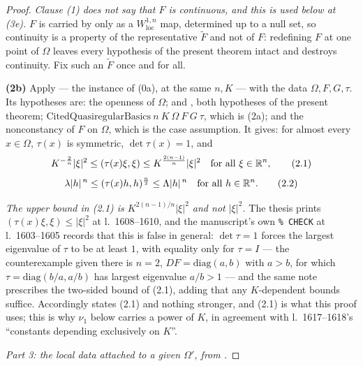 \begin{proof}
\emph{Clause (1) does not say that $F$ is continuous, and this is used below at
(3e).}  $F$ is carried by  only as a
$W^{1,n}_{\mathrm{loc}}$ map, determined up to a null set, so continuity is a
property of the representative $\widetilde F$ and not of $F$: redefining $F$ at
one point of $\Omega$ leaves every hypothesis of the present theorem intact and
destroys continuity.  Fix such an $\widetilde F$ once and for all.

\textbf{(2b)} Apply  --- the instance of (0a),
at the same $n,K$ --- with the data $\Omega,F,G,\tau$.  Its hypotheses are: the
openness of $\Omega$;  and
, both hypotheses of the present theorem;
$\mathrm{CitedQuasiregularBasics}\ n\ K\ \Omega\ F\ G\ \tau$, which is (2a); and
the nonconstancy of $F$ on $\Omega$, which is the case assumption.  It gives:
for almost every $x\in\Omega$, $\tau(x)$ is symmetric, $\det\tau(x)=1$, and
\[
K^{-\frac2n}|\xi|^2\le(\tau(x)\xi,\xi)\le K^{\frac{2(n-1)}n}|\xi|^2
\quad\text{for all }\xi\in\mathbb{R}^n,
\tag{2.1}
\]
\[
\lambda|h|^{\,n}\le(\tau(x)h,h)^{\frac n2}\le\Lambda|h|^{\,n}
\quad\text{for all }h\in\mathbb{R}^n .
\tag{2.2}
\]

\emph{The upper bound in \textup{(2.1)} is $K^{2(n-1)/n}|\xi|^2$ and not
$|\xi|^2$.}  The thesis prints $(\tau(x)\xi,\xi)\le|\xi|^2$ at l.~1608--1610, and
the manuscript's own \verb|% CHECK| at l.~1603--1605 records that this is false
in general: $\det\tau=1$ forces the largest eigenvalue of $\tau$ to be at least
$1$, with equality only for $\tau=I$ --- the counterexample given there is $n=2$,
$DF=\mathrm{diag}(a,b)$ with $a>b$, for which $\tau=\mathrm{diag}(b/a,a/b)$ has
largest eigenvalue $a/b>1$ --- and the same note prescribes the two-sided bound
of (2.1), adding that any $K$-dependent bounds suffice.  Accordingly
 states (2.1) and nothing stronger, and (2.1)
is what this proof uses; this is why $\nu_1$ below carries a power of $K$, in
agreement with l.~1617--1618's ``constants depending exclusively on $K$''.

\medskip
\noindent\emph{Part 3: the local data attached to a given $\Omega'$, from
.}


\end{proof}
